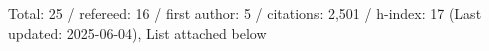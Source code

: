 Total: 25 / refereed: 16 / first author: 5 / citations: 2,501 / h-index: 17 (Last updated: 2025-06-04), List attached below